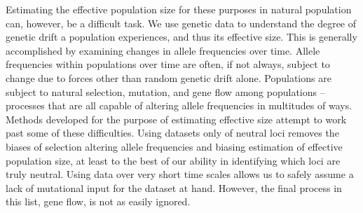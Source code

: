 Estimating the effective population size for these purposes in natural population can, however, be a difficult task. We use genetic data to understand the degree of genetic drift a population experiences, and thus its effective size. This is generally accomplished by examining changes in allele frequencies over time. Allele frequencies within populations over time are often, if not always, subject to change due to forces other than random genetic drift alone. Populations are subject to natural selection, mutation, and gene flow among populations -- processes that are all capable of altering allele frequencies in multitudes of ways. Methods developed for the purpose of estimating effective size attempt to work past some of these difficulties. Using datasets only of neutral loci removes the biases of selection altering allele frequencies and biasing estimation of effective population size, at least to the best of our ability in identifying which loci are truly neutral. Using data over very short time scales allows us to safely assume a lack of mutational input for the dataset at hand. However, the final process in this list, gene flow, is not as easily ignored.

